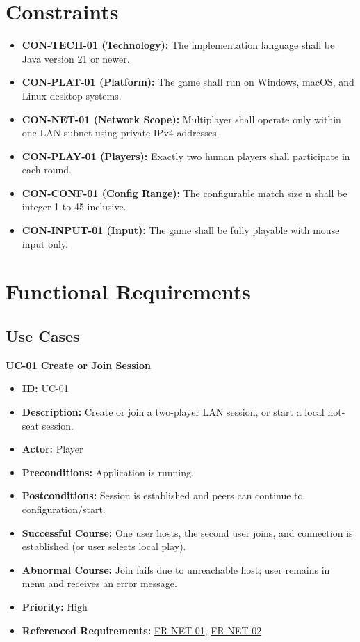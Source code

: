 \documentclass[a4paper,12pt]{article}
\newcommand{\reqref}[1]{\hyperlink{req:#1}{#1}}
\begin{document}
    \section{Constraints}
    \begin{itemize}[itemsep=0pt,topsep=0pt,parsep=0pt,partopsep=0pt]
        \item \textbf{CON-TECH-01 (Technology):} The implementation language shall be Java version 21 or newer.
        \item \textbf{CON-PLAT-01 (Platform):} The game shall run on Windows, macOS, and Linux desktop systems.
        \item \textbf{CON-NET-01 (Network Scope):} Multiplayer shall operate only within one LAN subnet using private IPv4 addresses.
        \item \textbf{CON-PLAY-01 (Players):} Exactly two human players shall participate in each round.
        \item \textbf{CON-CONF-01 (Config Range):} The configurable match size n shall be integer 1 to 45 inclusive.
        \item \textbf{CON-INPUT-01 (Input):} The game shall be fully playable with mouse input only.
    \end{itemize}

    \section{Functional Requirements}

    \subsection{Use Cases}

    \textbf{UC-01 Create or Join Session}
    \begin{itemize}[itemsep=0pt,topsep=0pt,parsep=0pt,partopsep=0pt]
        \item \textbf{ID:} UC-01
        \item \textbf{Description:} Create or join a two-player LAN session, or start a local hot-seat session.
        \item \textbf{Actor:} Player
        \item \textbf{Preconditions:} Application is running.
        \item \textbf{Postconditions:} Session is established and peers can continue to configuration/start.
        \item \textbf{Successful Course:} One user hosts, the second user joins, and connection is established (or user selects local play).
        \item \textbf{Abnormal Course:} Join fails due to unreachable host; user remains in menu and receives an error message.
        \item \textbf{Priority:} High
        \item \textbf{Referenced Requirements:} \reqref{FR-NET-01}, \reqref{FR-NET-02}
    \end{itemize}
\end{document}
